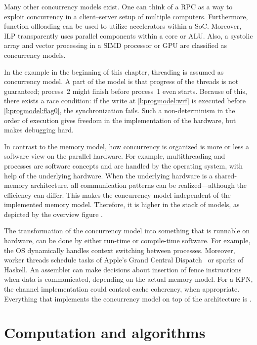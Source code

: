 Many other concurrency models exist.
One can think of a \ac{RPC} as a way to exploit concurrency in a client--server setup of multiple computers.
Furthermore, function offloading can be used to utilize accelerators within a \acl{SoC}.
Moreover, \ac{ILP} transparently uses parallel components within a core or \ac{ALU}.
Also, a systolic array and vector processing in a \ac{SIMD} processor or \ac{GPU} are classified as concurrency models.

In the example in the beginning of this chapter, threading is assumed as concurrency model.
A part of the model is that progress of the threads is not guaranteed; process~2 might finish before process~1 even starts.
Because of this, there exists a race condition: if the write at \cref{l:progmodel:wrf} is executed before \cref{l:progmodel:flag0}, the synchronization fails.
Such a non-determinism in the order of execution gives freedom in the implementation of the hardware, but makes debugging hard.

In contrast to the memory model, how concurrency is organized is more or less a software view on the parallel hardware.
For example, multithreading and processes are software concepts and are handled by the operating system, with help of the underlying hardware.
When the underlying hardware is a shared-memory architecture, all communication patterns can be realized---although the efficiency can differ.
This makes the concurrency model independent of the implemented memory model.
Therefore, it is higher in the stack of models, as depicted by the overview figure \chapfigpageref.

The transformation of the concurrency model into something that is runnable on hardware, can be done by either run-time or compile-time software.
For example, the \acl{OS} dynamically handles context switching between processes.
Moreover, worker threads schedule tasks of Apple's Grand Central Dispatch~\cite{apple:gcd} or sparks of Haskell.
An assembler can make decisions about insertion of fence instructions when data is communicated, depending on the actual memory model.
For a \ac{KPN}, the channel implementation could control cache coherency, when appropriate.
Everything that implements the concurrency model on top of the architecture is \emph{}.


\section{Computation and algorithms}

